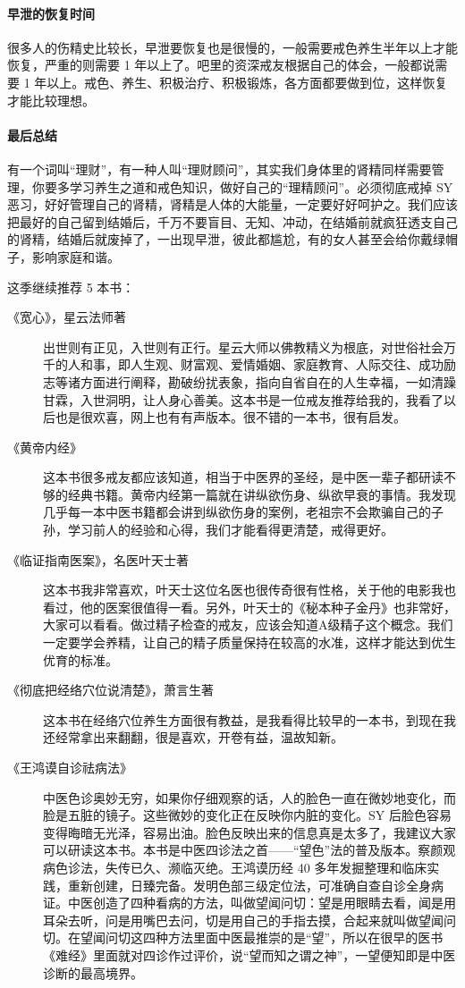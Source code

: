 \documentclass[fontset=founder]{ctexart}
\begin{document}
\paragraph{早泄的恢复时间}

很多人的伤精史比较长，早泄要恢复也是很慢的，一般需要戒色养生半年以上才能恢复，严重的则需要 1 年以上了。吧里的资深戒友根据自己的体会，一般都说需要 1 年以上。戒色、养生、积极治疗、积极锻炼，各方面都要做到位，这样恢复才能比较理想。

\paragraph{最后总结}

有一个词叫“理财”，有一种人叫“理财顾问”，其实我们身体里的肾精同样需要管理，你要多学习养生之道和戒色知识，做好自己的“理精顾问”。必须彻底戒掉 SY 恶习，好好管理自己的肾精，肾精是人体的大能量，一定要好好呵护之。我们应该把最好的自己留到结婚后，千万不要盲目、无知、冲动，在结婚前就疯狂透支自己的肾精，结婚后就废掉了，一出现早泄，彼此都尴尬，有的女人甚至会给你戴绿帽子，影响家庭和谐。

这季继续推荐 5 本书：

\begin{description}
   \item[《宽心》，星云法师著] 出世则有正见，入世则有正行。星云大师以佛教精义为根底，对世俗社会万千的人和事，即人生观、财富观、爱情婚姻、家庭教育、人际交往、成功励志等诸方面进行阐释，勘破纷扰表象，指向自省自在的人生幸福，一如清躁甘霖，入世洞明，让人身心善美。这本书是一位戒友推荐给我的，我看了以后也是很欢喜，网上也有有声版本。很不错的一本书，很有启发。
    \item[《黄帝内经》] 这本书很多戒友都应该知道，相当于中医界的圣经，是中医一辈子都研读不够的经典书籍。黄帝内经第一篇就在讲纵欲伤身、纵欲早衰的事情。我发现几乎每一本中医书籍都会讲到纵欲伤身的案例，老祖宗不会欺骗自己的子孙，学习前人的经验和心得，我们才能看得更清楚，戒得更好。
    \item[《临证指南医案》，名医叶天士著] 这本书我非常喜欢，叶天士这位名医也很传奇很有性格，关于他的电影我也看过，他的医案很值得一看。另外，叶天士的《秘本种子金丹》也非常好，大家可以看看。做过精子检查的戒友，应该会知道A级精子这个概念。我们一定要学会养精，让自己的精子质量保持在较高的水准，这样才能达到优生优育的标准。
    \item[《彻底把经络穴位说清楚》，萧言生著] 这本书在经络穴位养生方面很有教益，是我看得比较早的一本书，到现在我还经常拿出来翻翻，很是喜欢，开卷有益，温故知新。
    \item[《王鸿谟自诊祛病法》] 中医色诊奥妙无穷，如果你仔细观察的话，人的脸色一直在微妙地变化，而脸是五脏的镜子。这些微妙的变化正在反映你内脏的变化。SY 后脸色容易变得晦暗无光泽，容易出油。脸色反映出来的信息真是太多了，我建议大家可以研读这本书。本书是中医四诊法之首——“望色”法的普及版本。察颜观病色诊法，失传已久、濒临灭绝。王鸿谟历经 40 多年发掘整理和临床实践，重新创建，日臻完备。发明色部三级定位法，可准确自查自诊全身病证。中医创造了四种看病的方法，叫做望闻问切：望是用眼睛去看，闻是用耳朵去听，问是用嘴巴去问，切是用自己的手指去摸，合起来就叫做望闻问切。在望闻问切这四种方法里面中医最推崇的是“望”，所以在很早的医书《难经》里面就对四诊作过评价，说“望而知之谓之神”，一望便知即是中医诊断的最高境界。
\end{description}
\end{document}
